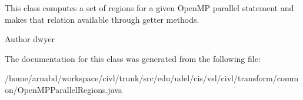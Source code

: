 This class computes a set of regions for a given Open\+M\+P parallel statement and makes that relation available through getter methods.

\begin{DoxyAuthor}{Author}
dwyer 
\end{DoxyAuthor}


The documentation for this class was generated from the following file\+:\begin{DoxyCompactItemize}
\item 
/home/arnabd/workspace/civl/trunk/src/edu/udel/cis/vsl/civl/transform/common/Open\+M\+P\+Parallel\+Regions.\+java\end{DoxyCompactItemize}
